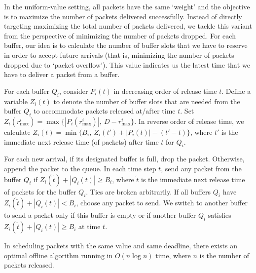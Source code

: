 \documentclass[final, 11pt]{article}
\begin{document}
In the uniform-value setting, all packets have the same `weight' and the objective is to maximize the number of packets delivered successfully. Instead of directly targeting maximizing the total number of packets delivered, we tackle this variant from the perspective of minimizing the number of packets dropped. For each buffer, our idea is to calculate the number of buffer slots that we have to reserve in order to accept future arrivals (that is, minimizing the number of packets dropped due to `packet overflow'). This value indicates us the latest time that we have to deliver a packet from a buffer.

\begin{algorithm}
For each buffer $Q_i$, consider $P_i(t)$ in decreasing order of release time $t$. Define a variable $Z_i(t)$ to denote the number of buffer slots that are needed from the buffer $Q_i$ to accommodate packets released at/after time $t$. Set $Z_i(r^i_{\max}) = \max\{|P_i(r^i_{\max})|, \ D - r^i_{\max}\}$. In reverse order of release time, we calculate $Z_i(t) = \min\{B_i, \ Z_i(t') + |P_i(t)| - (t' - t)\}$, where $t'$ is the immediate next release time (of packets) after time $t$ for $Q_i$.

For each new arrival, if its designated buffer is full, drop the packet. Otherwise, append the packet to the queue. In each time step $t$, send any packet from the buffer $Q_i$ if $Z_i({\tilde t}) + |Q_i(t)| \ge B_i$, where ${\tilde t}$ is the immediate next release time of packets for the buffer $Q_i$. Ties are broken arbitrarily. If all buffers $Q_i$ have $Z_i({\tilde t}) + |Q_i(t)| < B_i$, choose any packet to send. We switch to another buffer to send a packet only if this buffer is empty or if another buffer $Q_i$ satisfies $Z_i({\tilde t}) + |Q_i(t)| \ge B_i$ at time $t$.
\label{alg:multiuniform}
\end{algorithm}

\begin{theorem}
In scheduling packets with the same value and same deadline, there exists an optimal offline algorithm running in $O(n \log n)$ time, where $n$ is the number of packets released.
\label{theorem:uniformoff}
\end{theorem}
\end{document}
